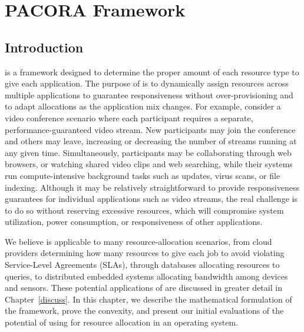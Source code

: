 \chapter{PACORA Framework}
\section{Introduction}
\pacora is a framework designed to determine the proper amount of each
resource type to give each application.  The purpose of \pacora is to dynamically assign resources
across multiple applications to guarantee responsiveness without
over-provisioning and to adapt allocations as the application mix
changes. For example, consider a video conference scenario where each participant requires a separate,
performance-guaranteed video stream.  New participants may join the
conference and others may leave, increasing or decreasing the number
of streams running at any given time.  Simultaneously, participants
may be collaborating through web browsers, or watching shared video
clips and web searching, while their systems run compute-intensive
background tasks such as updates, virus scans, or file indexing.
Although it may be relatively straightforward to provide
responsiveness guarantees for individual applications such as video
streams, the real challenge is to do so without reserving excessive
resources, which will compromise system utilization, power
consumption, or responsiveness of other applications.

We believe \pacora is applicable to many resource-allocation
scenarios, from cloud providers determining how many resources to give
each job to avoid violating Service-Level Agreements (SLAs), through databases allocating
resources to queries, to distributed embedded systems allocating
bandwidth among devices and sensors.  These potential applications of \pacora are discussed in greater detail in Chapter~\ref{discuss}. In this chapter, we describe the mathematical formulation of the \pacora framework, prove the convexity, and present our initial evaluations of the potential of using \pacora for resource allocation in an operating system.

